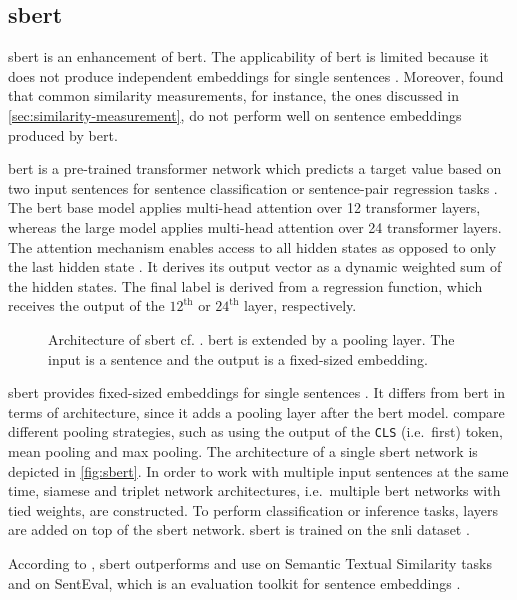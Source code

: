 \subsection{\acl*{sbert}}\label{subsec:hf-sent-ransformers}

\acf{sbert} is an enhancement of \ac{bert}.
The applicability of \ac{bert} is limited because it does not produce independent embeddings for single sentences \cite{HfsentTrans2019}.
Moreover, \citeauthor{HfsentTrans2019} found that common similarity measurements, for instance, the ones discussed in \autoref{sec:similarity-measurement}, 
do not perform well on sentence embeddings produced by \ac{bert}.

\ac{bert} is a pre-trained transformer network which 
predicts a target value based on two input sentences for sentence classification or sentence-pair regression tasks \cite{HfsentTrans2019}.
The \ac{bert} base model applies multi-head attention over 12 transformer layers, whereas the large model applies multi-head attention over 24 transformer layers.
The attention mechanism enables access to all hidden states as opposed to only the last hidden state \cite{attention_book2023}.
It derives its output vector as a dynamic weighted sum of the hidden states.
The final label is derived from a regression function, which receives the output of the $12^\text{th}$ or $24^\text{th}$ layer, respectively.

\begin{figure}[!htb] %
    \centering
    
    \caption[Architecture of \acs*{sbert}]{Architecture of \acs*{sbert} cf. \cite{HfsentTrans2019}.
    \acs*{bert} is extended by a pooling layer.
    The input is a sentence and the output is a fixed-sized embedding.
    }
    \label{fig:sbert}
\end{figure}

\ac{sbert} provides fixed-sized embeddings for single sentences \cite{HfsentTrans2019}.
It differs from \ac{bert} in terms of architecture, since it adds a pooling layer after the \ac{bert} model.
\citeauthor{HfsentTrans2019} compare different pooling strategies, such as using the output of the \texttt{CLS} (i.e.\ first) token, mean pooling and max pooling.
The architecture of a single \ac{sbert} network is depicted in \autoref{fig:sbert}.
In order to work with multiple input sentences at the same time, siamese and triplet network architectures, 
i.e.\ multiple \ac{bert} networks with tied weights, are constructed.
To perform classification or inference tasks, layers are added on top of the \ac{sbert} network.
\ac{sbert} is trained on the \ac{snli} dataset \cite{HfsentTrans2019, snli_dataset}.

According to \citeauthor{HfsentTrans2019}, \ac{sbert} outperforms \infersent{} and \ac{use} on Semantic Textual Similarity tasks 
and on SentEval, which is an evaluation toolkit for sentence embeddings \cite{HfsentTrans2019}.
